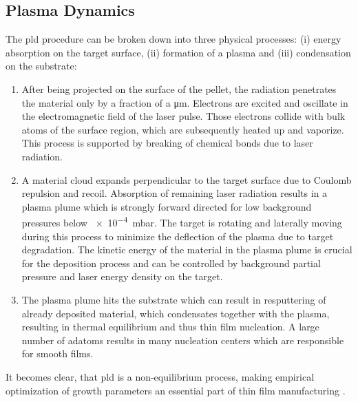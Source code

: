 \subsection{Plasma Dynamics}
The \gls{pld} procedure can be broken down into three physical processes: (i) energy absorption on the target surface, (ii) formation of a plasma and (iii) condensation on the substrate:
\begin{enumerate}[label=(\roman*)]
    \item After being projected on the surface of the pellet, the radiation penetrates the material only by a fraction of a \unit{\um}.
    Electrons are excited and oscillate in the electromagnetic field of the laser pulse.
    Those electrons collide with bulk atoms of the surface region, which are subsequently heated up and vaporize.
    This process is supported by breaking of chemical bonds due to laser radiation.
    \item A material cloud expands perpendicular to the target surface due to Coulomb repulsion and recoil.
    Absorption of remaining laser radiation results in a plasma plume which is strongly forward directed for low background pressures below \qty{e-4}{\milli\bar}.
    The target is rotating and laterally moving during this process to minimize the deflection of the plasma due to target degradation.
    The kinetic energy of the material in the plasma plume is crucial for the deposition process and can be controlled by background partial pressure and laser energy density on the target.
    \item The plasma plume hits the substrate which can result in resputtering of already deposited material, which condensates together with the plasma, resulting in thermal equilibrium and thus thin film nucleation.
    A large number of adatoms results in many nucleation centers which are responsible for smooth films.
\end{enumerate}
It becomes clear, that \gls{pld} is a non-equilibrium process, making empirical optimization of growth parameters an essential part of thin film manufacturing
    \cite{lorenz2019}.

